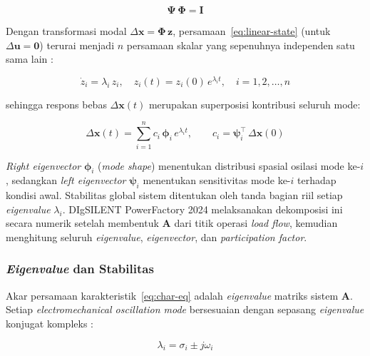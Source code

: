 \begin{equation}
  \boldsymbol{\Psi}\,\boldsymbol{\Phi} = \mathbf{I}
  \label{eq:biorthogonal}
\end{equation}

Dengan transformasi modal $\Delta\mathbf{x} = \boldsymbol{\Phi}\,\mathbf{z}$,
persamaan~\eqref{eq:linear-state} (untuk $\Delta\mathbf{u} = \mathbf{0}$) terurai
menjadi $n$ persamaan skalar yang sepenuhnya independen satu sama lain
\cite{sauer2006power}:

\begin{equation}
  \dot{z}_i = \lambda_i\,z_i, \quad z_i(t) = z_i(0)\,e^{\lambda_i t},
  \quad i = 1, 2, \ldots, n
  \label{eq:modal-decoupled}
\end{equation}

sehingga respons bebas $\Delta\mathbf{x}(t)$ merupakan superposisi kontribusi
seluruh mode:

\begin{equation}
  \Delta\mathbf{x}(t) = \sum_{i=1}^{n} c_i\,\boldsymbol{\phi}_i\,e^{\lambda_i t},
  \qquad c_i = \boldsymbol{\psi}_i^\top\,\Delta\mathbf{x}(0)
  \label{eq:free-response}
\end{equation}

\textit{Right eigenvector} $\boldsymbol{\phi}_i$ (\textit{mode shape}) menentukan
distribusi spasial osilasi mode ke-$i$, sedangkan \textit{left eigenvector}
$\boldsymbol{\psi}_i$ menentukan sensitivitas mode ke-$i$ terhadap kondisi awal.
Stabilitas global sistem ditentukan oleh tanda bagian riil setiap \textit{eigenvalue}
$\lambda_i$. DIgSILENT PowerFactory 2024 melaksanakan dekomposisi ini secara numerik
setelah membentuk $\mathbf{A}$ dari titik operasi \textit{load flow}, kemudian
menghitung seluruh \textit{eigenvalue}, \textit{eigenvector}, dan
\textit{participation factor}.

\subsubsection{\textit{Eigenvalue} dan Stabilitas}

Akar persamaan karakteristik~\eqref{eq:char-eq} adalah \textit{eigenvalue} matriks
sistem $\mathbf{A}$. Setiap \textit{electromechanical oscillation mode} bersesuaian
dengan sepasang \textit{eigenvalue} konjugat kompleks \cite{kundur1994power}:

\begin{equation}
  \lambda_i = \sigma_i \pm j\omega_i
  \label{eq:def-eigenvalue}
\end{equation}

